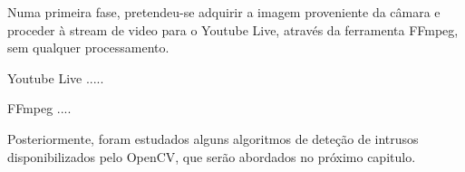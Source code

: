 Numa primeira fase, pretendeu-se adquirir a imagem proveniente da câmara e proceder à stream de video para o Youtube Live, através da ferramenta FFmpeg, sem qualquer processamento.  

Youtube Live .....


FFmpeg .... 


Posteriormente, foram estudados alguns algoritmos de deteção de intrusos disponibilizados pelo OpenCV, que serão abordados no próximo capitulo. 
















